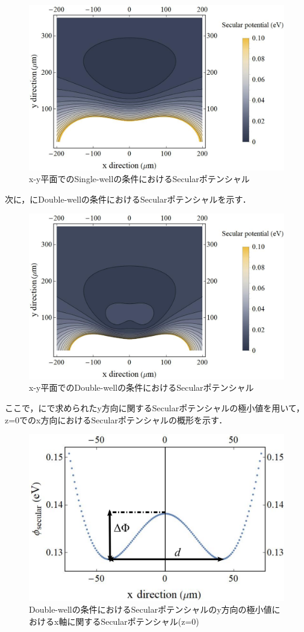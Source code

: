 \begin{figure}[h]
	\begin{center}
		\includegraphics[width = 0.6\linewidth]{./simulation/figure/Single-well_Secular_pot_xy.jpg}
		\caption{x-y平面でのSingle-wellの条件におけるSecularポテンシャル}
		\label{fig:SecPot_single-well}
	\end{center}
\end{figure}

次に，にDouble-wellの条件におけるSecularポテンシャルを示す．

\begin{figure}[h]
	\begin{center}
		\includegraphics[width = 0.6\linewidth]{./simulation/figure/Double-well_Secular_pot_xy.jpg}
		\caption{x-y平面でのDouble-wellの条件におけるSecularポテンシャル}
		\label{fig:SecPot_double-well}
	\end{center}
\end{figure}

%
\clearpage
%
ここで，にで求められたy方向に関するSecularポテンシャルの極小値を用いて，z=0でのx方向におけるSecularポテンシャルの概形を示す．
\begin{figure}[h]
	\begin{center}
		\includegraphics[width = 0.6\linewidth]{./simulation/figure/Double-well_z=0.png}
		\caption{Double-wellの条件におけるSecularポテンシャルのy方向の極小値におけるx軸に関するSecularポテンシャル(z=0)}
		\label{fig:Double-well_z0}
	\end{center}
\end{figure}

